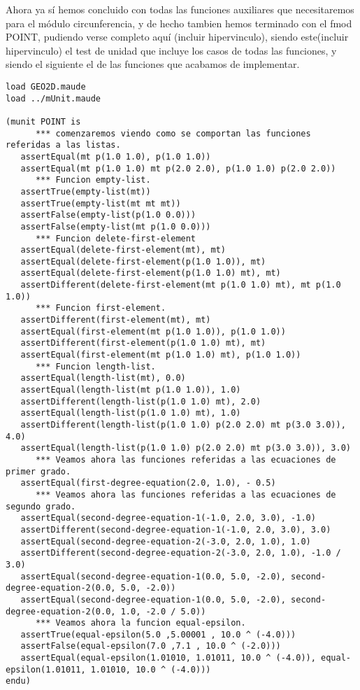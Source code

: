 Ahora ya s\'i hemos concluido con todas las funciones auxiliares que necesitaremos para el m\'odulo circunferencia, y de hecho tambien hemos terminado con el fmod POINT, pudiendo verse completo aqu\'i (incluir hipervinculo), siendo este(incluir hipervinculo) el test de unidad que incluye los casos de todas las funciones, y siendo el siguiente el de las funciones que acabamos de implementar. \par

\begin{verbatim}
load GEO2D.maude
load ../mUnit.maude

(munit POINT is
      *** comenzaremos viendo como se comportan las funciones referidas a las listas.
   assertEqual(mt p(1.0 1.0), p(1.0 1.0))
   assertEqual(mt p(1.0 1.0) mt p(2.0 2.0), p(1.0 1.0) p(2.0 2.0))
      *** Funcion empty-list.
   assertTrue(empty-list(mt))
   assertTrue(empty-list(mt mt mt))
   assertFalse(empty-list(p(1.0 0.0)))
   assertFalse(empty-list(mt p(1.0 0.0)))
      *** Funcion delete-first-element
   assertEqual(delete-first-element(mt), mt)
   assertEqual(delete-first-element(p(1.0 1.0)), mt)
   assertEqual(delete-first-element(p(1.0 1.0) mt), mt)
   assertDifferent(delete-first-element(mt p(1.0 1.0) mt), mt p(1.0 1.0))
      *** Funcion first-element.
   assertDifferent(first-element(mt), mt)
   assertEqual(first-element(mt p(1.0 1.0)), p(1.0 1.0))
   assertDifferent(first-element(p(1.0 1.0) mt), mt)
   assertEqual(first-element(mt p(1.0 1.0) mt), p(1.0 1.0))
      *** Funcion length-list.
   assertEqual(length-list(mt), 0.0)
   assertEqual(length-list(mt p(1.0 1.0)), 1.0)
   assertDifferent(length-list(p(1.0 1.0) mt), 2.0)
   assertEqual(length-list(p(1.0 1.0) mt), 1.0)
   assertDifferent(length-list(p(1.0 1.0) p(2.0 2.0) mt p(3.0 3.0)), 4.0)
   assertEqual(length-list(p(1.0 1.0) p(2.0 2.0) mt p(3.0 3.0)), 3.0)
      *** Veamos ahora las funciones referidas a las ecuaciones de primer grado.
   assertEqual(first-degree-equation(2.0, 1.0), - 0.5)
      *** Veamos ahora las funciones referidas a las ecuaciones de segundo grado.
   assertEqual(second-degree-equation-1(-1.0, 2.0, 3.0), -1.0)
   assertDifferent(second-degree-equation-1(-1.0, 2.0, 3.0), 3.0)
   assertEqual(second-degree-equation-2(-3.0, 2.0, 1.0), 1.0)
   assertDifferent(second-degree-equation-2(-3.0, 2.0, 1.0), -1.0 / 3.0)
   assertEqual(second-degree-equation-1(0.0, 5.0, -2.0), second-degree-equation-2(0.0, 5.0, -2.0))
   assertEqual(second-degree-equation-1(0.0, 5.0, -2.0), second-degree-equation-2(0.0, 1.0, -2.0 / 5.0))
      *** Veamos ahora la funcion equal-epsilon.
   assertTrue(equal-epsilon(5.0 ,5.00001 , 10.0 ^ (-4.0)))
   assertFalse(equal-epsilon(7.0 ,7.1 , 10.0 ^ (-2.0)))
   assertEqual(equal-epsilon(1.01010, 1.01011, 10.0 ^ (-4.0)), equal-epsilon(1.01011, 1.01010, 10.0 ^ (-4.0)))
endu)
\end{verbatim}

